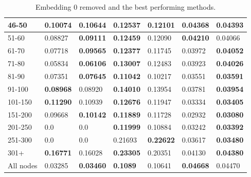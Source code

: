 \begin{table}[h!]
\begin{tabular}{|l|l|l||l|l||l|l|}
        46-50     & 0.10074                                 & \textbf{0.10644}               & \textbf{0.12537}                 & 0.12101           & 0.04368          & \textbf{0.04393}  \\ \hline
        51-60     & 0.08827                                 & \textbf{0.09111}               & \textbf{0.12459}                 & 0.12090           & \textbf{0.04210} & 0.04066           \\ \hline
        61-70     & 0.07718                                 & \textbf{0.09565}               & \textbf{0.12377}                 & 0.11745           & 0.03972          & \textbf{0.04052}  \\ \hline
        71-80     & 0.05834                                 & \textbf{0.06106}               & \textbf{0.13007}                 & 0.12483           & 0.03923          & \textbf{0.04026}  \\ \hline
        81-90     & 0.07351                                 & \textbf{0.07645}               & \textbf{0.11042}                 & 0.10217           & 0.03551          & \textbf{0.03591}  \\ \hline
        91-100    & \textbf{0.08968}                        & 0.08920                        & \textbf{0.14010}                 & 0.13954           & 0.03781          & \textbf{0.03954}  \\ \hline
        101-150   & \textbf{0.11290}                        & 0.10939                        & \textbf{0.12676}                 & 0.11947           & 0.03334          & \textbf{0.03405}  \\ \hline
        151-200   & 0.09668                                 & \textbf{0.10142}               & \textbf{0.11889}                 & 0.11728           & 0.02932          & \textbf{0.03080}  \\ \hline
        201-250   & 0.0                                     & 0.0                            & \textbf{0.11999}                 & 0.10884           & 0.03242          & \textbf{0.03392}  \\ \hline
        251-300   & 0.0                                     & 0.0                            & 0.21693                          & \textbf{0.22622}  & 0.03617          & \textbf{0.03480}  \\ \hline
        301+      & \textbf{0.16771}                        & 0.16028                        & \textbf{0.23305}                 & 0.20351           & 0.04130          & \textbf{0.04380}  \\ \hline
        All nodes & 0.03285                                 & \textbf{0.03460}               & \textbf{0.1089}                  & 0.10641           & \textbf{0.04668} & 0.04470           \\ \hline
    \end{tabular}
    \label{tab:ndcg-adjusted-layer-remove-0-embedding}
    \caption{Embedding 0 removed and the best performing methods.}
\end{table}

